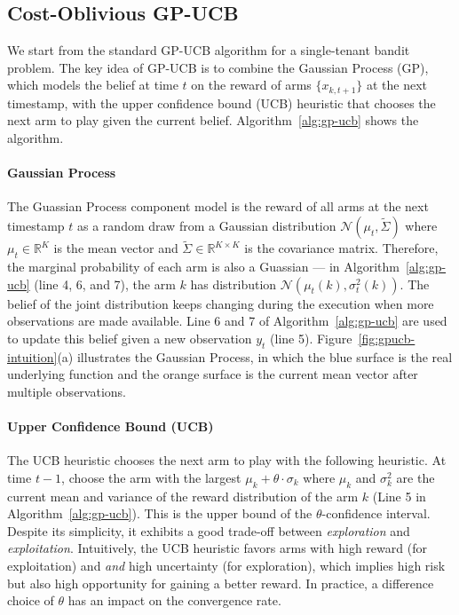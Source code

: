 \documentclass[letterpaper]{vldb}
\begin{document}
\vspace{-1em}
\subsection{Cost-Oblivious GP-UCB}

We start from the standard GP-UCB algorithm for a single-tenant bandit problem.
The key idea of GP-UCB is to combine the Gaussian Process (GP),
which models the belief at time $t$ on the reward of arms $\{x_{k,{t+1}}\}$
at the next timestamp, with the upper confidence bound (UCB) 
heuristic that chooses the next arm to play given the current belief.
Algorithm~\ref{alg:gp-ucb} shows the algorithm.


\vspace{-0.75em}
\paragraph*{Gaussian Process} The Guassian Process component model is
the reward of all arms at the next timestamp $t$ as a random draw from a 
Gaussian distribution
$\mathcal{N}(\mu_t, \tilde{\Sigma})$ where $\mu_t \in \mathbb{R}^K$ is the
mean vector and $\tilde{\Sigma} \in \mathbb{R}^{K \times K}$ is the covariance
matrix. Therefore, the marginal probability of each arm is also a Guassian ---
in Algorithm~\ref{alg:gp-ucb} (line 4, 6, and 7), the arm $k$ has distribution
$\mathcal{N}(\mu_t(k), \sigma_t^2(k))$. The belief of the joint distribution
keeps changing during the execution when more observations are made
available. Line 6 and 7 of Algorithm~\ref{alg:gp-ucb} are used to
update this belief given a new observation $y_t$ (line 5).
Figure~\ref{fig:gpucb-intuition}(a) illustrates the Gaussian Process, in which
the blue surface is the real underlying function and the orange
surface is the current mean vector after multiple observations.


\vspace{-0.75em}
\paragraph*{Upper Confidence Bound (UCB)} The UCB heuristic
chooses the next arm to play with the following heuristic. At time $t-1$,
choose the arm with the largest $\mu_k + \theta\cdot\sigma_k$ where 
$\mu_k$ and $\sigma_k^2$ are the current mean and variance of the 
reward distribution of the arm $k$ (Line 5 in Algorithm~\ref{alg:gp-ucb}). 
This is the upper bound of the $\theta$-confidence interval.
Despite its simplicity, it exhibits a good trade-off between \emph{exploration} and \emph{exploitation}.
Intuitively, the UCB heuristic favors arms with high reward (for exploitation) and \emph{and} high uncertainty (for exploration), which implies high risk but also high opportunity for gaining a better reward.
In practice, a difference choice of $\theta$ has an impact on the convergence rate.
\end{document}
